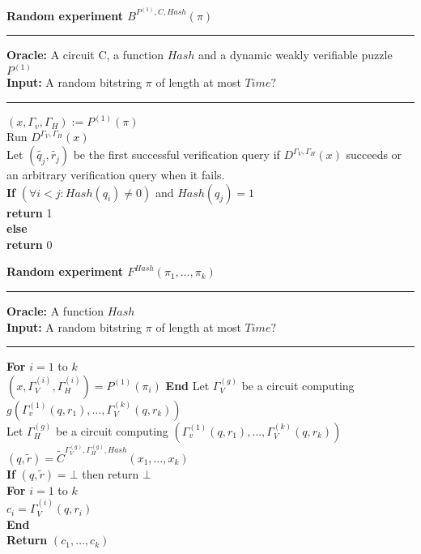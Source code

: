 \begin{codeblock}
  \textbf{Random experiment $B^{P^{(1)}, C, Hash}(\pi)$}
  \medskip

  \hrule

  \medskip

  \textbf{Oracle:} A circuit C, a function $Hash$ and a dynamic weakly verifiable puzzle $P^{(1)}$\\
  \textbf{Input:} A random bitstring $\pi$ of length at most $Time ? $
  \medskip\hrule\medskip

  $(x, \Gamma_v, \Gamma_H) := P^{(1)}(\pi)$ \\
  Run $D^{\Gamma_V, \Gamma_H}(x)$ \\
  \IndI Let $(\widetilde{q_j},\widetilde{r_j})$ be the first successful verification query if $D^{\Gamma_V, \Gamma_H}(x)$ succeeds or \\
  \IndI an arbitrary verification query when it fails.\\
  \textbf{If} $(\forall i < j :  Hash(q_i) \neq 0 )$ and $Hash(q_j) = 1$ \\
  \IndI \textbf{return} 1\\
  \textbf{else}\\
  \IndI \textbf{return} 0\\

\end{codeblock}

\begin{codeblock}
  \textbf{Random experiment $F^{Hash}(\pi_1, \dots, \pi_k)$}
  \medskip

  \hrule

  \medskip

  \textbf{Oracle:} A function $Hash$ \\
  \textbf{Input:} A random bitstring $\pi$ of length at most $Time ? $
  \medskip\hrule\medskip
  \textbf{For} $i=1$ to $k$ \\
  \IndI $(x, \Gamma_V^{(i)}, \Gamma_H^{(i)}) = P^{(1)}(\pi_i)$
  \textbf{End}
  Let $\Gamma_V^{(g)} $ be a circuit computing $g(\Gamma_v^{(1)}(q, r_1), \dots, \Gamma_V^{(k)}(q, r_k))$ \\
  Let $\Gamma_H^{(g)} $ be a circuit computing $(\Gamma_v^{(1)}(q, r_1), \dots, \Gamma_V^{(k)}(q, r_k))$ \\
  $(q,\widetilde{r}) = \widetilde{C}^{\Gamma_V^{(g)}, \Gamma_H^{(g)}, Hash} (x_1, \dots, x_k)$ \\
  \textbf{If} $(q, \widetilde{r}) = \bot$ then return $\bot$ \\
  \textbf{For} $i = 1$ to $k$ \\
  \IndI $c_i = \Gamma_V^{(i)}(q,r_i)$ \\
  \textbf{End}\\
  \textbf{Return} $(c_1, \dots, c_k)$

\end{codeblock}



